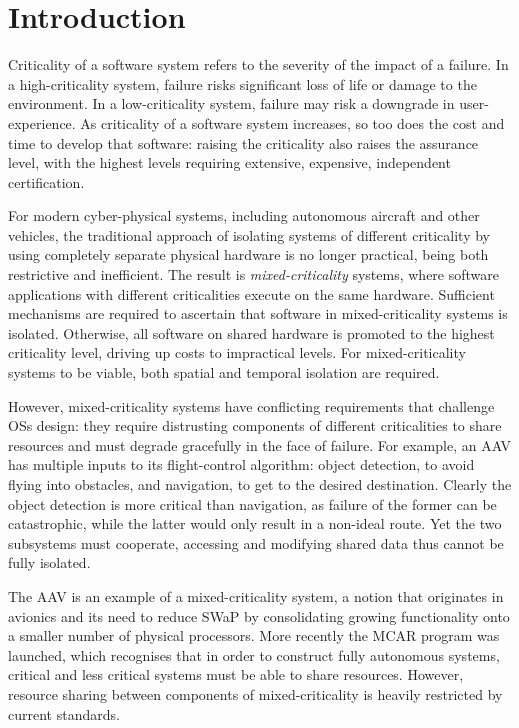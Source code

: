 \chapter{Introduction}

Criticality of a software system refers to the severity of the impact of a failure.
In a high-criticality system, failure risks significant loss of life or damage to the environment.
In a low-criticality system, failure may risk a downgrade in user-experience.
As criticality of a software system increases, so too does the cost and time to develop that
software: raising the criticality also raises the assurance level, with the highest levels requiring
extensive, expensive, independent certification.

For modern cyber-physical systems, including autonomous aircraft and other vehicles, the traditional
approach of isolating systems of different criticality by using completely separate physical
hardware is no
longer practical, being both restrictive and inefficient.
The result is \emph{mixed-criticality} systems, where software applications with different criticalities
execute on the same hardware. Sufficient mechanisms are required to ascertain that software in
mixed-criticality systems is isolated. Otherwise, all software on shared hardware is
promoted
to the highest criticality level, driving up costs to impractical levels. For mixed-criticality
systems to be
viable, both spatial and temporal isolation are required.

However, mixed-criticality systems have conflicting requirements that challenge \glspl{OS} design:
they require distrusting components of different criticalities to share resources and must
degrade gracefully in the face of failure.  For example, an \gls{AAV} has multiple inputs to its
flight-control algorithm: object detection, to avoid flying into obstacles, and navigation, to get
to the desired destination.  Clearly the object detection is more critical than navigation, as
failure of the former can be catastrophic, while the latter would only result in a non-ideal route.
Yet the two subsystems must cooperate, accessing and modifying shared data thus cannot be fully
isolated.

The \gls{AAV} is an example of a mixed-criticality system, a notion that originates in avionics and its
need to reduce \gls{SWaP} by consolidating growing functionality onto a smaller
number of physical processors. More recently the
\gls{MCAR}\citep{Barhorst_BBHPSSSSU_09} program was launched, which recognises that in order to
construct fully autonomous systems, critical and less critical systems must be able to share
resources. However, resource sharing between components of mixed-criticality is heavily restricted by current
standards.

